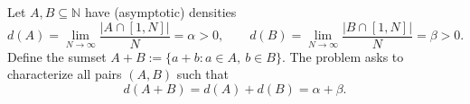 Let $A,B\subseteq\mathbb{N}$ have (asymptotic) densities
\[
 d(A)=\lim_{N\to\infty}\frac{|A\cap[1,N]|}{N}=\alpha>0,
 \qquad
 d(B)=\lim_{N\to\infty}\frac{|B\cap[1,N]|}{N}=\beta>0.
\]
Define the sumset $A+B:=\{a+b: a\in A,\ b\in B\}$. The problem asks to characterize all pairs $(A,B)$ such that
\[
 d(A+B)=d(A)+d(B)=\alpha+\beta.
\]
